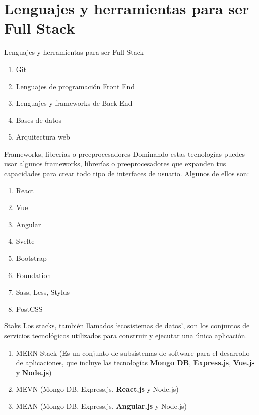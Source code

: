 \documentclass[11pt]{beamer}
\begin{document}
\section{Lenguajes y herramientas para ser Full Stack}
\begin{frame}{Lenguajes y herramientas para ser Full Stack}
	\begin{enumerate}
		\item Git
		\item Lenguajes de programación Front End
		\item Lenguajes y frameworks de Back End
		\item Bases de datos
		\item Arquitectura web
	\end{enumerate}
\end{frame}

\begin{frame}{Frameworks, librerías o preeprocesadores}
	Dominando estas tecnologías puedes usar algunos frameworks, librerías o preeprocesadores que expanden tus capacidades para crear todo tipo de interfaces de usuario. Algunos de ellos son:
	\begin{enumerate}
\item 	React
	\item Vue
	\item Angular
	\item Svelte
	\item Bootstrap
	\item Foundation
	\item Sass, Less, Stylus
	\item PostCSS
	\end{enumerate}


\end{frame}

\begin{frame}{Staks}
	Los stacks, también llamados ‘ecosistemas de datos’, son los conjuntos de servicios tecnológicos utilizados para construir y ejecutar una única aplicación. 
	\begin{enumerate}
		\item MERN Stack (Es un conjunto de subsistemas de software para el desarrollo de aplicaciones, que incluye las tecnologías \textbf{Mongo DB}, \textbf{Express.js}, \textbf{Vue.js} y \textbf{Node.js})
		\item MEVN ({Mongo DB}, {Express.js}, \textbf{React.js} y {Node.js})
		\item MEAN ({Mongo DB}, {Express.js}, \textbf{Angular.js} y {Node.js})
	\end{enumerate}
\end{frame}
\end{document}
